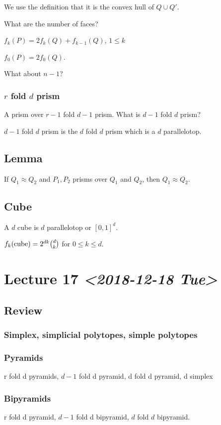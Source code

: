 \documentclass[11pt]{article}
\begin{document}
{{We use the definition that it is the convex hull of \(Q \cup Q'\).

What are the number of faces?

\(f_k(P) = 2f_k(Q) + f_{k-1}(Q)\), \(1 \le k\)

\(f_0(P) = 2f_0(Q)\).

What about \(n-1\)?
\subsubsection{\(r\) fold \(d\) prism}
\label{sec:orgfea99dc}
A prism over \(r-1\) fold \(d-1\) prism. What is \(d-1\) fold \(d\) prism?

\(d-1\) fold \(d\) prism is the \(d\) fold \(d\) prism which is a \(d\) parallelotop.
\subsection{Lemma}
\label{sec:org2f1a6a2}
If \(Q_1 \approx Q_2\) and \(P_1, P_2\) prisms over \(Q_1\) and \(Q_2\), then \(Q_1
   \approx Q_2\).
\subsection{Cube}
\label{sec:orgc1a6efa}
A \(d\) cube is \(d\) parallelotop or \([0,1]^d\).

\(f_k(\textup{cube}) = 2^{dk} \binom{d}{k}\) for \(0 \le k \le d\).
\section{Lecture 17 \textit{<2018-12-18 Tue>}}
\label{sec:orgfcf2819}
\subsection{Review}
\label{sec:org60d5e3f}
\subsubsection{Simplex, simplicial polytopes, simple polytopes}
\label{sec:orgd20e92c}
\subsubsection{Pyramids}
\label{sec:org846e1d9}
r fold d pyramids, \(d-1\) fold d pyramid, d fold d pyramid, d simplex
\subsubsection{Bipyramids}
\label{sec:org622f52f}
r fold d pyramid, \(d-1\) fold d bipyramid, \(d\) fold \(d\) bipyramid.

}}
\end{document}
